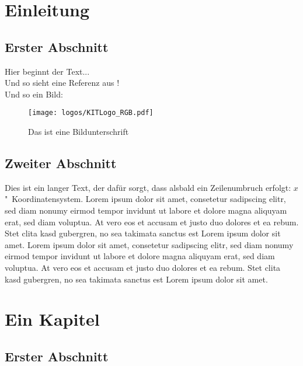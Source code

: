 
\chapter{Einleitung}
\label{ch:Introduction}

\section{Erster Abschnitt}
Hier beginnt der Text...\\
%
Und so sieht eine Referenz aus \cite{becker2008a}!\\[3em]

%
Und so ein Bild:\\
\begin{figure}[h]
  \begin{center}
    \texttt{[image: logos/KITLogo\_RGB.pdf]}
    \caption{Das ist eine Bildunterschrift}
  \end{center}
\end{figure}

\section{Zweiter Abschnitt}

Dies ist ein langer Text, der dafür sorgt, dass alsbald ein Zeilenumbruch erfolgt: $x$"~Koordinatensystem. Lorem ipsum dolor sit amet, consetetur sadipscing elitr, sed diam nonumy eirmod tempor invidunt ut labore et dolore magna aliquyam erat, sed diam voluptua. At vero eos et accusam et justo duo dolores et ea rebum. Stet clita kasd gubergren, no sea takimata sanctus est Lorem ipsum dolor sit amet. Lorem ipsum dolor sit amet, consetetur sadipscing elitr, sed diam nonumy eirmod tempor invidunt ut labore et dolore magna aliquyam erat, sed diam voluptua. At vero eos et accusam et justo duo dolores et ea rebum. Stet clita kasd gubergren, no sea takimata sanctus est Lorem ipsum dolor sit amet.



\chapter{Ein Kapitel}
\label{ch:Content1}


\section{Erster Abschnitt}
\label{ch:Content1:sec:Section1}


